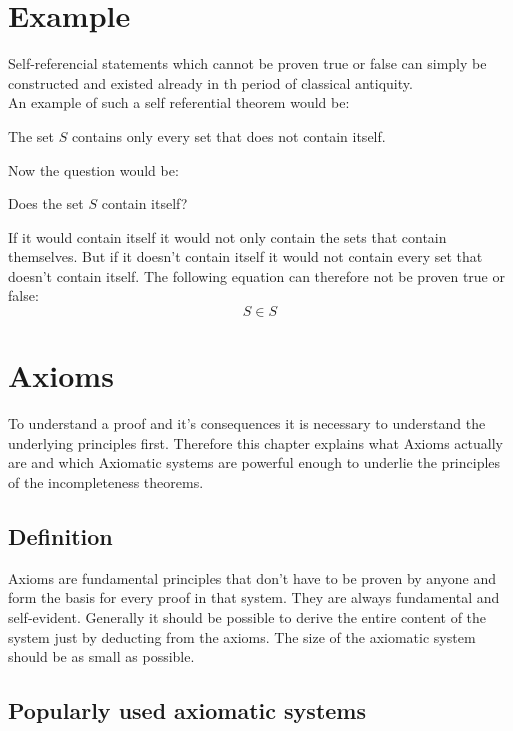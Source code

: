 \documentclass[english,12pt]{article}
\begin{document}
\section{Example}
Self-referencial statements which cannot be proven true or false can simply be constructed and existed already in th period of classical antiquity.\\
An example of such a self referential theorem would be:
\begin{displayquote}
    The set $S$ contains only every set that does not contain itself.
\end{displayquote}
Now the question would be:
\begin{displayquote}
    Does the set $S$ contain itself?
\end{displayquote}
If it would contain itself it would not only contain the sets that contain themselves. But if it doesn't contain itself it would not contain every set that doesn't contain itself. The following equation can therefore not be proven true or false:
$$
    S \in S
$$
\section{Axioms}
To understand a proof and it's consequences it is necessary to understand the underlying principles first. Therefore this chapter explains what Axioms actually are and which Axiomatic systems are powerful enough to underlie the principles of the incompleteness theorems. 
\subsection{Definition}
Axioms are fundamental principles that don't have to be proven by anyone and form the basis for every proof in that system. They are always fundamental and self-evident. Generally it should be possible to derive the entire content of the system just by deducting from the axioms. The size of the axiomatic system should be as small as possible. 
\subsection{Popularly used axiomatic systems}
\end{document}
